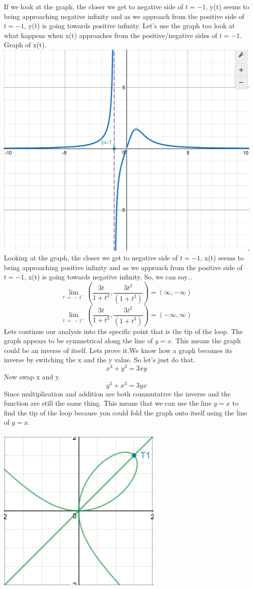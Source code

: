 \documentclass[a4paper,openright, 14pt]{article}
\begin{document}
If we look at the graph, the closer we get to negative side of $t=-1$, y(t) seems to being approaching negative infinity and as we approach from the positive side of $t=-1$, y(t) is going towards positive infinity. Let's use the graph too look at what happens when x(t) approaches from the positive/negative sides of $t=-1$.\\
Graph of x(t).\\
\includegraphics[width = 14 cm, height = 7 cm]{X(t).png}\\
Looking at the graph, the closer we get to negative side of $t=-1$, x(t) seems to being approaching positive infinity and as we approach from the positive side of $t=-1$, x(t) is going towards negative infinity. So, we can say...\\
$$\lim_{t\to\ -1^-} (\frac{3t}{1+t^3},\frac{3t^2}{(1+t^3)})=(\infty,-\infty) $$
$$\lim_{t\to\ -1^+} (\frac{3t}{1+t^3},\frac{3t^2}{(1+t^3)})=(-\infty,\infty) $$
Lets continue our analysis into the specific point that is the tip of the loop. The graph appears to be symmetrical along the line of $y=x$. This means the graph could be an inverse of itself. Lets prove it.We know how a graph becomes its inverse by switching the x and the y value. So let's just do that.
$$x^3 + y^3=3xy$$
Now swap x and y.
$$y^3 + x^3=3yx$$
Since multiplication and addition are both commutative the inverse and the function are still the same thing. This means that we can use the line $y=x$ to find the tip of the loop because you could fold the graph onto itself using the line of $y=x$.\\
\\
\includegraphics[width = 4 cm, height = 4 cm]{SM.png}\\
\end{document}
